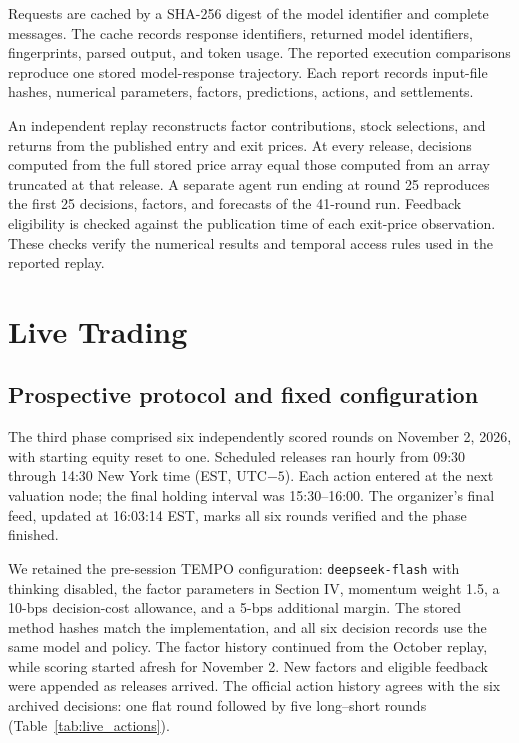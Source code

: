 \documentclass[conference]{IEEEtran}
\begin{document}
Requests are cached by a SHA-256 digest of the model identifier and complete messages. The cache records response identifiers, returned model identifiers, fingerprints, parsed output, and token usage. The reported execution comparisons reproduce one stored model-response trajectory. Each report records input-file hashes, numerical parameters, factors, predictions, actions, and settlements.

An independent replay reconstructs factor contributions, stock selections, and returns from the published entry and exit prices. At every release, decisions computed from the full stored price array equal those computed from an array truncated at that release. A separate agent run ending at round 25 reproduces the first 25 decisions, factors, and forecasts of the 41-round run. Feedback eligibility is checked against the publication time of each exit-price observation. These checks verify the numerical results and temporal access rules used in the reported replay.

\FloatBarrier
\section{Live Trading}
\subsection{Prospective protocol and fixed configuration}
The third phase comprised six independently scored rounds on November 2, 2026, with starting equity reset to one\cite{task2protocol,task2livefinal}. Scheduled releases ran hourly from 09:30 through 14:30 New York time (EST, UTC$-5$). Each action entered at the next valuation node; the final holding interval was 15:30--16:00. The organizer's final feed, updated at 16:03:14 EST, marks all six rounds verified and the phase finished.

We retained the pre-session TEMPO configuration: \texttt{deepseek-flash} with thinking disabled, the factor parameters in Section IV, momentum weight 1.5, a 10-bps decision-cost allowance, and a 5-bps additional margin. The stored method hashes match the implementation, and all six decision records use the same model and policy. The factor history continued from the October replay, while scoring started afresh for November 2. New factors and eligible feedback were appended as releases arrived. The official action history agrees with the six archived decisions: one flat round followed by five long--short rounds (Table~\ref{tab:live_actions}).
\end{document}
